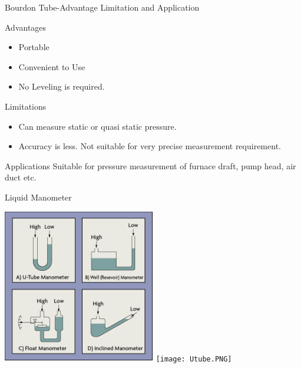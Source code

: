 \documentclass[11pt]{beamer}
\begin{document}
\begin{frame}{Bourdon Tube-Advantage Limitation and Application}

       \begin{exampleblock}{Advantages}
          \begin{itemize}
           
           \item Portable
 
           \item Convenient to Use
           
           \item No Leveling is required.
           
                     
          
          \end{itemize}
        
       
       \end{exampleblock}
       
       \begin{exampleblock}{Limitations}
          \begin{itemize}
           
           \item Can measure static or quasi static pressure.
 
           \item Accuracy is less. Not suitable for very precise measurement requirement.
           
          \end{itemize}
        
       \end{exampleblock}


        \begin{exampleblock}{Applications}
           Suitable for pressure measurement of furnace draft, pump head, air duct etc.   
        \end{exampleblock}

\end{frame}



\begin{frame}{Liquid Manometer}
		
		\begin{center}
			\includegraphics[width=0.5\textwidth]{LiqMano.png}
			\texttt{[image: Utube.PNG]}
		\end{center}

\end{frame}
\end{document}
